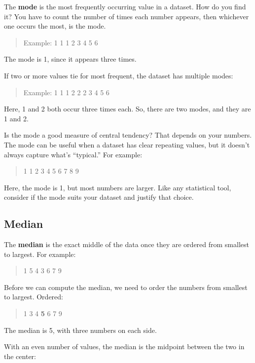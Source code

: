 \documentclass[
  letterpaper,
  DIV=11,
  numbers=noendperiod]{scrreprt}
\begin{document}
The \textbf{mode} is the most frequently occurring value in a dataset.
How do you find it? You have to count the number of times each number
appears, then whichever one occurs the most, is the mode.

\begin{quote}
Example: 1 1 1 2 3 4 5 6
\end{quote}

The mode is 1, since it appears three times.

If two or more values tie for most frequent, the dataset has multiple
modes:

\begin{quote}
Example: 1 1 1 2 2 2 3 4 5 6
\end{quote}

Here, 1 and 2 both occur three times each. So, there are two modes, and
they are 1 and 2.

Is the mode a good measure of central tendency? That depends on your
numbers. The mode can be useful when a dataset has clear repeating
values, but it doesn't always capture what's ``typical.'' For example:

\begin{quote}
1 1 2 3 4 5 6 7 8 9
\end{quote}

Here, the mode is 1, but most numbers are larger. Like any statistical
tool, consider if the mode suits your dataset and justify that choice.

\subsection{Median}\label{median}

The \textbf{median} is the exact middle of the data once they are
ordered from smallest to largest. For example:

\begin{quote}
1 5 4 3 6 7 9
\end{quote}

Before we can compute the median, we need to order the numbers from
smallest to largest. Ordered:

\begin{quote}
1 3 4 \textbf{5} 6 7 9
\end{quote}

The median is 5, with three numbers on each side.

With an even number of values, the median is the midpoint between the
two in the center:
\end{document}
